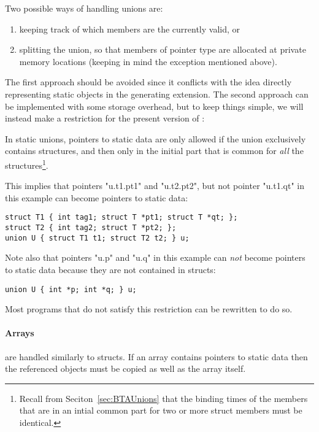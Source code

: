 \begin{docpart}
Two possible ways of handling unions are:

\begin{enumerate}
\item[1.] keeping track of which members are the currently valid, or
\item[2.] splitting the union, so that members of pointer type are
allocated at private memory locations (keeping in mind the exception
mentioned above).
\end{enumerate}

\noindent The first approach should be avoided since it conflicts with
the idea directly representing static objects in the generating extension.
The second approach can be implemented with some storage overhead, but to
keep things simple, we will instead make a restriction for the present
version of \cmix:
\begin{constraint}[Unions]%
%
\label{cns:SLFUnion}
In static unions, pointers to static data are only allowed if the
union exclusively contains structures, and then only in the initial
part that is common for \emph{all} the structures\footnote{Recall
  from Seciton~\ref{sec:BTAUnions} that the binding times of the
  members that are in an intial common part for two or more struct
  members must be identical.}.
\end{constraint}
This implies that pointers "u.t1.pt1" and "u.t2.pt2", but not pointer
"u.t1.qt" in this example can become pointers to static data:
\begin{verbatim}
struct T1 { int tag1; struct T *pt1; struct T *qt; };
struct T2 { int tag2; struct T *pt2; };
union U { struct T1 t1; struct T2 t2; } u;
\end{verbatim}
Note also that pointers "u.p" and "u.q" in this example can \emph{not}
become pointers to static data because they are not contained in
structs:
\begin{verbatim}
union U { int *p; int *q; } u;
\end{verbatim}
Most programs that do not satisfy this restriction can be rewritten to 
do so.

\paragraph{Arrays}
\label{sec-arrays}
are handled similarly to structs. If an array contains
pointers to static data then the referenced objects must be copied as
well as the array itself.


\end{docpart}
